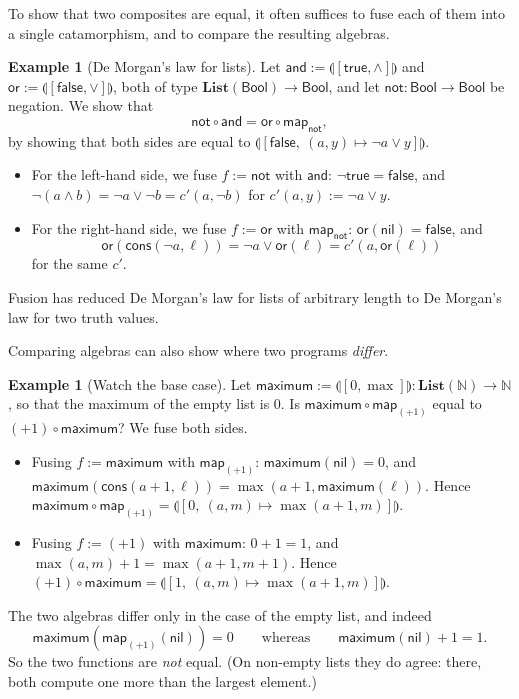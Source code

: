 \documentclass[a4paper,11pt, oneside,titlepage=false]{scrbook}
\theoremstyle{plain}
\theoremstyle{definition}
\newtheorem{exa}[thm]{Example}
\newcommand{\Catb}[1]{\mathbf{#1}}
\newcommand{\List}{\Catb{List}}
\newcommand{\catam}[1]{\llparenthesis #1 \rrparenthesis}
\newcommand{\nil}{\ensuremath{\mathsf{nil}}}
\newcommand{\cons}{\ensuremath{\mathsf{cons}}}
\newcommand{\NN}{\ensuremath{\mathbb{N}}}
\newcommand{\Bool}{\ensuremath{\mathsf{Bool}}}
\begin{document}
To show that two composites are equal, it often suffices to fuse each of them into a single catamorphism, and to compare the resulting algebras.

\begin{exa}[De Morgan's law for lists]\label{exa:fusion-demorgan}
  Let $\mathsf{and} := \catam{[\mathsf{true}, \wedge]}$ and $\mathsf{or} := \catam{[\mathsf{false}, \vee]}$, both of type $\List(\Bool) \to \Bool$, and let $\mathsf{not} : \Bool \to \Bool$ be negation.
  We show that
  \[ \mathsf{not} \circ \mathsf{and} = \mathsf{or} \circ \mathsf{map}_{\mathsf{not}}, \]
  by showing that both sides are equal to $\catam{[\mathsf{false},\ (a, y) \mapsto \neg a \vee y]}$.
  \begin{itemize}
  \item For the left-hand side, we fuse $f := \mathsf{not}$ with $\mathsf{and}$:
    $\neg \mathsf{true} = \mathsf{false}$, and $\neg(a \wedge b) = \neg a \vee \neg b = c'(a, \neg b)$ for $c'(a, y) := \neg a \vee y$.
  \item For the right-hand side, we fuse $f := \mathsf{or}$ with $\mathsf{map}_{\mathsf{not}}$:
    $\mathsf{or}(\nil) = \mathsf{false}$, and
    \[ \mathsf{or}(\cons(\neg a, \ell)) = \neg a \vee \mathsf{or}(\ell) = c'(a, \mathsf{or}(\ell)) \]
    for the same $c'$.
  \end{itemize}
  Fusion has reduced De Morgan's law for lists of arbitrary length to De Morgan's law for two truth values.
\end{exa}

Comparing algebras can also show where two programs \emph{differ}.

\begin{exa}[Watch the base case]\label{exa:fusion-maximum}
  Let $\mathsf{maximum} := \catam{[0, \max]} : \List(\NN) \to \NN$, so that the maximum of the empty list is $0$.
  Is $\mathsf{maximum} \circ \mathsf{map}_{(+1)}$ equal to $(+1) \circ \mathsf{maximum}$?
  We fuse both sides.
  \begin{itemize}
  \item Fusing $f := \mathsf{maximum}$ with $\mathsf{map}_{(+1)}$:
    $\mathsf{maximum}(\nil) = 0$, and $\mathsf{maximum}(\cons(a+1, \ell)) = \max(a + 1, \mathsf{maximum}(\ell))$.
    Hence $\mathsf{maximum} \circ \mathsf{map}_{(+1)} = \catam{[0,\ (a, m) \mapsto \max(a+1, m)]}$.
  \item Fusing $f := (+1)$ with $\mathsf{maximum}$:
    $0 + 1 = 1$, and $\max(a, m) + 1 = \max(a + 1, m + 1)$.
    Hence $(+1) \circ \mathsf{maximum} = \catam{[1,\ (a, m) \mapsto \max(a+1, m)]}$.
  \end{itemize}
  The two algebras differ only in the case of the empty list, and indeed
  \[ \mathsf{maximum}(\mathsf{map}_{(+1)}(\nil)) = 0 \qquad\text{whereas}\qquad \mathsf{maximum}(\nil) + 1 = 1. \]
  So the two functions are \emph{not} equal.
  (On non-empty lists they do agree: there, both compute one more than the largest element.)
\end{exa}
\end{document}
